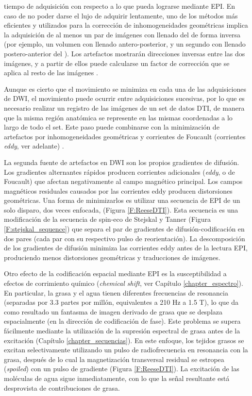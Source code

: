 tiempo de adquisición con respecto a lo que pueda lograrse mediante EPI. En caso de no poder darse el lujo de adquirir lentamente, uno de los métodos más eficientes y utilizados para la corrección de inhomogeneidades geométricas implica la adquisición de al menos un par de imágenes con llenado del \espaciok de forma inversa (por ejemplo, un volumen con llenado antero-posterior, y un segundo con llenado postero-anterior del \espaciok). Los artefactos mostrarán direcciones inversas entre las dos imágenes, y a partir de ellos puede calcularse un factor de corrección que se aplica al resto de las imágenes \cite{andersson2016integrated}.

Aunque es cierto que el movimiento se minimiza en cada una de las adquisiciones de DWI, el movimiento puede ocurrir entre adquisiciones sucesivas, por lo que es necesario realizar un registro de las imágenes de un set de datos DTI, de manera que la misma región anatómica se represente en las mismas coordenadas a lo largo de todo el set. Este paso puede combinarse con la minimización de artefactos por inhomogeneidades geométricas y corrientes de Foucault (corrientes \textit{eddy}, ver adelante) \cite{andersson2016integrated}.

La segunda fuente de artefactos en DWI son los propios gradientes de difusión. Los gradientes alternantes rápidos producen corrientes adicionales (\textit{eddy}, o de Foucault) que afectan negativamente al campo magnético principal. Los campos magnéticos residuales causados por las corrientes eddy producen distorsiones geométricas. Una forma de minimizarlos es utilizar una secuencia de EPI de un solo disparo, dos veces enfocada, \cite{Reese_2003} (Figura \ref{F:ReeseDTI}). Esta secuencia es una modificación de la secuencia de spin-eco de Stejskal y Tanner (Figura \ref{F:stejskal_sequence}) que separa el par de gradientes de difusión-codificación en dos pares (cada par con su respectivo pulso de reorientación). La descomposición de los gradientes de difusión minimiza las corrientes eddy antes de la lectura EPI, produciendo menos distorsiones geométricas y traducciones de imágenes.

Otro efecto de la codificación espacial mediante EPI es la susceptibilidad a efectos de corrimiento químico (\textit{chemical shift}, ver Capítulo \ref{chapter_espectro}). En particular, la grasa y el agua tienen diferentes frecuencias de resonancia (separadas por 3.3 partes por millón, equivalentes a 210 Hz a 1.5 T), lo que da como resultado un fantasma de imagen derivado de grasa que se desplaza espacialmente (en la dirección de codificación de fase). Este problema se supera fácilmente mediante la utilización de la supresión espectral de grasa antes de la excitación (Capítulo \ref{chapter_secuencias}). En este enfoque, los tejidos grasos se excitan selectivamente utilizando un pulso de radiofrecuencia en resonancia con la grasa, después de lo cual la magnetización transversal residual se estropea (\textit{spoiled}) con un pulso de gradiente (Figura \ref{F:ReeseDTI}). La excitación de las moléculas de agua sigue inmediatamente, con lo que la señal resultante está desprovista de contribuciones de grasa.



